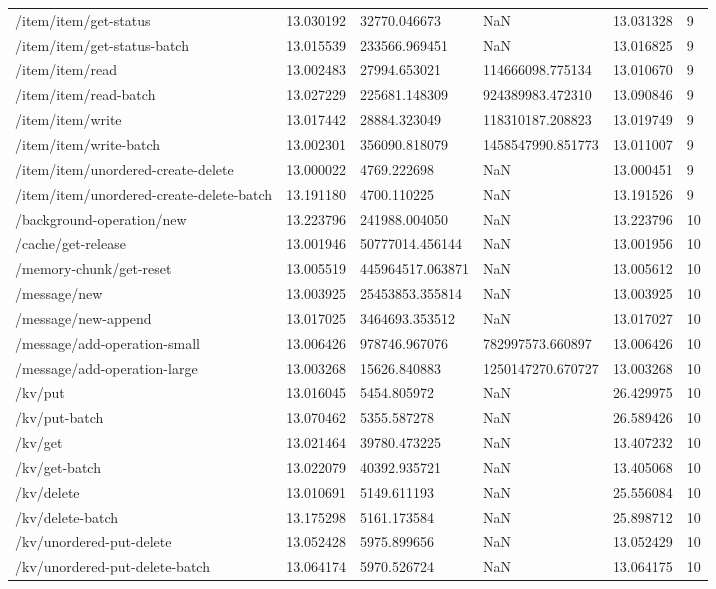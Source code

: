 \begin{tabularx}{\linewidth}{XXXXXX}
/item/item/get-status & 13.030192 & 32770.046673 & NaN & 13.031328 & 9 \\
/item/item/get-status-batch & 13.015539 & 233566.969451 & NaN & 13.016825 & 9 \\
/item/item/read & 13.002483 & 27994.653021 & 114666098.775134 & 13.010670 & 9 \\
/item/item/read-batch & 13.027229 & 225681.148309 & 924389983.472310 & 13.090846 & 9 \\
/item/item/write & 13.017442 & 28884.323049 & 118310187.208823 & 13.019749 & 9 \\
/item/item/write-batch & 13.002301 & 356090.818079 & 1458547990.851773 & 13.011007 & 9 \\
/item/item/unordered-create-delete & 13.000022 & 4769.222698 & NaN & 13.000451 & 9 \\
/item/item/unordered-create-delete-batch & 13.191180 & 4700.110225 & NaN & 13.191526 & 9 \\
/background-operation/new & 13.223796 & 241988.004050 & NaN & 13.223796 & 10 \\
/cache/get-release & 13.001946 & 50777014.456144 & NaN & 13.001956 & 10 \\
/memory-chunk/get-reset & 13.005519 & 445964517.063871 & NaN & 13.005612 & 10 \\
/message/new & 13.003925 & 25453853.355814 & NaN & 13.003925 & 10 \\
/message/new-append & 13.017025 & 3464693.353512 & NaN & 13.017027 & 10 \\
/message/add-operation-small & 13.006426 & 978746.967076 & 782997573.660897 & 13.006426 & 10 \\
/message/add-operation-large & 13.003268 & 15626.840883 & 1250147270.670727 & 13.003268 & 10 \\
/kv/put & 13.016045 & 5454.805972 & NaN & 26.429975 & 10 \\
/kv/put-batch & 13.070462 & 5355.587278 & NaN & 26.589426 & 10 \\
/kv/get & 13.021464 & 39780.473225 & NaN & 13.407232 & 10 \\
/kv/get-batch & 13.022079 & 40392.935721 & NaN & 13.405068 & 10 \\
/kv/delete & 13.010691 & 5149.611193 & NaN & 25.556084 & 10 \\
/kv/delete-batch & 13.175298 & 5161.173584 & NaN & 25.898712 & 10 \\
/kv/unordered-put-delete & 13.052428 & 5975.899656 & NaN & 13.052429 & 10 \\
/kv/unordered-put-delete-batch & 13.064174 & 5970.526724 & NaN & 13.064175 & 10 \\

\end{tabularx}
